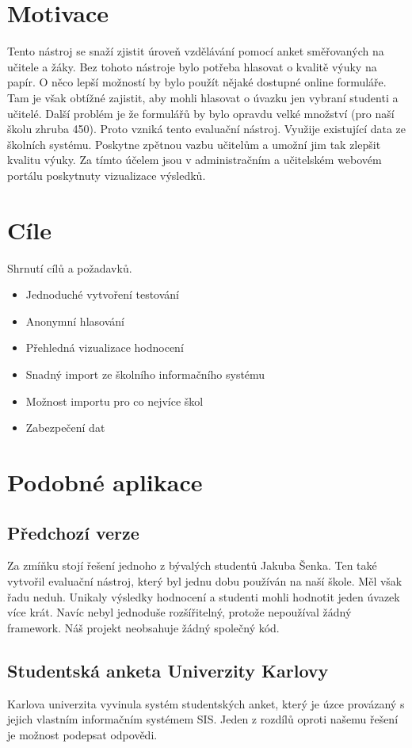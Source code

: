 \section{Motivace}
Tento nástroj se snaží zjistit úroveň vzdělávání pomocí anket směřovaných na učitele a žáky. Bez tohoto nástroje bylo potřeba hlasovat o kvalitě výuky na papír. O něco lepší možností by bylo použít nějaké dostupné online formuláře. Tam je však obtížné zajistit, aby mohli hlasovat o úvazku jen vybraní studenti a učitelé. Další problém je že formulářů by bylo opravdu velké množství (pro naší školu zhruba 450). Proto vzniká tento evaluační nástroj. Využije existující data ze školních systému. Poskytne zpětnou vazbu učitelům a umožní jim tak zlepšit kvalitu výuky. Za tímto účelem jsou v administračním a učitelském webovém portálu poskytnuty vizualizace výsledků.

\section{Cíle}
Shrnutí cílů a požadavků.
\begin{itemize}
    \item Jednoduché vytvoření testování
    \item Anonymní hlasování
    \item Přehledná vizualizace hodnocení
    \item Snadný import ze školního informačního systému
    \item Možnost importu pro co nejvíce škol
    \item Zabezpečení dat
\end{itemize}

\section{Podobné aplikace}
\subsection{Předchozí verze}\label{uvod:predchozi-verze}
Za zmíňku stojí řešení jednoho z bývalých studentů Jakuba Šenka. Ten také vytvořil evaluační nástroj, který byl jednu dobu používán na naší škole. Měl však řadu neduh. Unikaly výsledky hodnocení a studenti mohli hodnotit jeden úvazek více krát.  Navíc nebyl jednoduše rozšířitelný, protože nepoužíval žádný framework. Náš projekt neobsahuje žádný společný kód.
\subsection{Studentská anketa Univerzity Karlovy}
Karlova univerzita vyvinula systém studentských anket, který je úzce provázaný s jejich vlastním informačním systémem SIS.  Jeden z rozdílů oproti našemu řešení je možnost podepsat odpovědi.\cite{matfyz-anketa}



